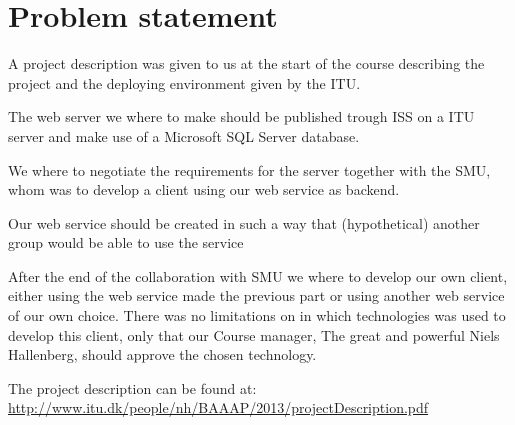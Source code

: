 \section{Problem statement}
A project description was given to us at the start of the course describing the project and the deploying environment given by the ITU.

The web server we where to make should be published trough ISS on a ITU server and make use of a Microsoft SQL Server database.

We where to negotiate the requirements for the server together with the SMU, whom was to develop a client using our web service as backend.

Our web service should be created in such a way that (hypothetical) another group would be able to use the service

After the end of the collaboration with SMU we where to develop our own client, either using the web service made the previous part or using another web service of our own choice.
There was no limitations on in which technologies was used to develop this client, only that our Course manager, The great and powerful Niels Hallenberg, should approve the chosen technology.

The project description can be found at: \url{http://www.itu.dk/people/nh/BAAAP/2013/projectDescription.pdf}
\newpage